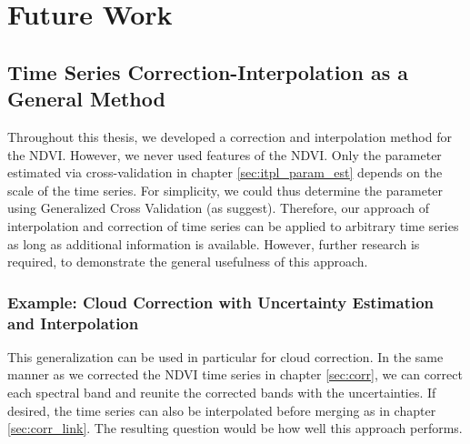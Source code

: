 \section{Future Work}{
    \label{sec:FutureWork}

    \subsection{Time Series Correction-Interpolation as a General Method}{
        Throughout this thesis, we developed a correction and interpolation method for the NDVI. However, we never used features of the NDVI. Only the parameter estimated via cross-validation in chapter \ref{sec:itpl_param_est} depends on the scale of the time series. For simplicity, we could thus determine the parameter using Generalized Cross Validation (as  suggest). Therefore, our approach of interpolation and correction of time series can be applied to arbitrary time series as long as additional information is available. However, further research is required, to demonstrate the general usefulness of this approach.


        \subsubsection*{Example: Cloud Correction with Uncertainty Estimation and Interpolation}
            This generalization can be used in particular for cloud correction. In the same manner as we corrected the NDVI time series in chapter \ref{sec:corr}, we can correct each spectral band and reunite the corrected bands with the uncertainties. If desired, the time series can also be interpolated before merging as in chapter \ref{sec:corr_link}. The resulting question would be how well this approach performs.
    }



}
